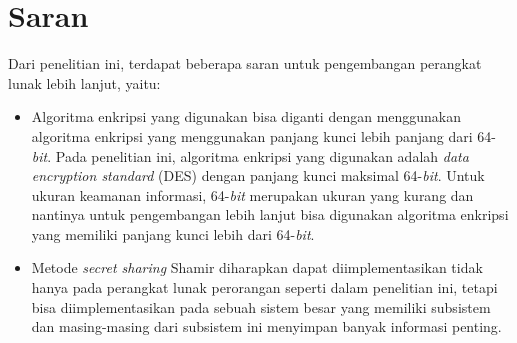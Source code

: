 \section{Saran}

Dari penelitian ini, terdapat beberapa saran untuk pengembangan perangkat lunak lebih lanjut, yaitu:
\begin{itemize}
	\item Algoritma enkripsi yang digunakan bisa diganti dengan menggunakan algoritma enkripsi yang menggunakan panjang kunci lebih panjang dari 64-\textit{bit}. Pada penelitian ini, algoritma enkripsi yang digunakan adalah \textit{data encryption standard} (DES) dengan panjang kunci maksimal 64-\textit{bit}. Untuk ukuran keamanan informasi, 64-\textit{bit} merupakan ukuran yang kurang dan nantinya untuk pengembangan lebih lanjut bisa digunakan algoritma enkripsi yang memiliki panjang kunci lebih dari 64-\textit{bit}.
	\item Metode \textit{secret sharing} Shamir diharapkan dapat diimplementasikan tidak hanya pada perangkat lunak perorangan seperti dalam penelitian ini, tetapi bisa diimplementasikan pada sebuah sistem besar yang memiliki subsistem dan masing-masing dari subsistem ini menyimpan banyak informasi penting.
\end{itemize}